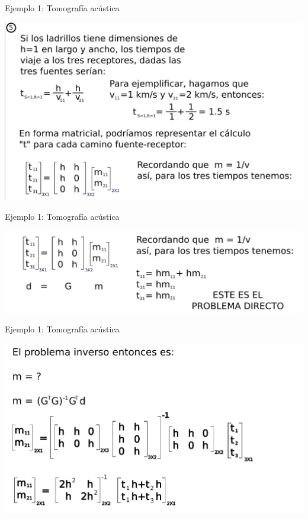 \documentclass[aspectratio=169]{beamer}
\begin{document}
\begin{frame}
 {Ejemplo 1: Tomografía acústica}
 
 \begin{center}
 \includegraphics[width=0.85\linewidth]{images/tomografia_6.png}
 \end{center}

\end{frame}


\begin{frame}
 {Ejemplo 1: Tomografía acústica}
 
 \begin{center}
 \includegraphics[width=0.8\linewidth]{images/tomografia_7.png}
 \end{center}

\end{frame}

\begin{frame}
 {Ejemplo 1: Tomografía acústica}
 
 \begin{center}
 \includegraphics[width=0.8\linewidth]{images/tomografia_8.png}
 \end{center}

\end{frame}
\end{document}
